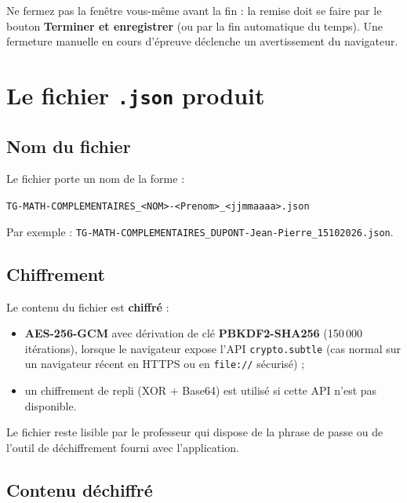 \documentclass[11pt,a4paper]{article}
\begin{document}
\begin{attention}
Ne fermez pas la fenêtre vous-même avant la fin : la remise doit se faire par
le bouton \textbf{Terminer et enregistrer} (ou par la fin automatique du
temps). Une fermeture manuelle en cours d'épreuve déclenche un avertissement
du navigateur.
\end{attention}

\section{Le fichier \texttt{.json} produit}

\subsection{Nom du fichier}

Le fichier porte un nom de la forme :

\begin{center}
\verb|TG-MATH-COMPLEMENTAIRES_<NOM>-<Prenom>_<jjmmaaaa>.json|
\end{center}

Par exemple : \verb|TG-MATH-COMPLEMENTAIRES_DUPONT-Jean-Pierre_15102026.json|.

\subsection{Chiffrement}

Le contenu du fichier est \textbf{chiffré} :
\begin{itemize}
  \item \textbf{AES-256-GCM} avec dérivation de clé \textbf{PBKDF2-SHA256}
        (150\,000 itérations), lorsque le navigateur expose l'API
        \texttt{crypto.subtle} (cas normal sur un navigateur récent en
        HTTPS ou en \texttt{file://} sécurisé) ;
  \item un chiffrement de repli (XOR + Base64) est utilisé si cette API
        n'est pas disponible.
\end{itemize}
Le fichier reste lisible par le professeur qui dispose de la phrase de
passe ou de l'outil de déchiffrement fourni avec l'application.

\subsection{Contenu déchiffré}
\end{document}
